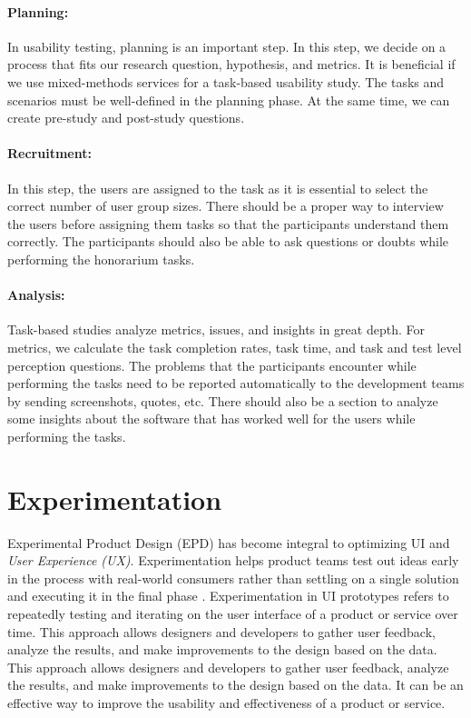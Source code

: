 \paragraph{Planning: } 
In usability testing, planning is an important step. 
In this step, we decide on a process that fits our research question, hypothesis, and metrics.  
It is beneficial if we use mixed-methods services for a task-based usability study.
The tasks and scenarios must be well-defined in the planning phase. At the same time, we can create pre-study and post-study questions. 
\paragraph{Recruitment: } 
In this step, the users are assigned to the task as it is essential to select the correct number of user group sizes.
There should be a proper way to interview the users before assigning them tasks so that the participants understand them correctly. 
The participants should also be able to ask questions or doubts while performing the honorarium tasks. 
\paragraph{Analysis: }
Task-based studies analyze metrics, issues, and insights in great depth.
For metrics, we calculate the task completion rates, task time, and task and test level perception questions.
The problems that the participants encounter while performing the tasks need to be reported automatically to the development teams by sending screenshots, quotes, etc. 
There should also be a section to analyze some insights about the software that has worked well for the users while performing the tasks.
\clearpage
\section{Experimentation}
\label{background:section:experimentproduct}
Experimental Product Design (EPD) has become integral to optimizing UI and \textit{User Experience (UX)}.
Experimentation helps product teams test out ideas early in the process with real-world consumers rather than settling on a single solution and executing it in the final phase \cite{misc:CE:miklos}.
Experimentation in UI prototypes refers to repeatedly testing and iterating on the user interface of a product or service over time. This approach allows designers and developers to gather user feedback, analyze the results, and make improvements to the design based on the data. 
This approach allows designers and developers to gather user feedback, analyze the results, and make improvements to the design based on the data.
It can be an effective way to improve the usability and effectiveness of a product or service.

